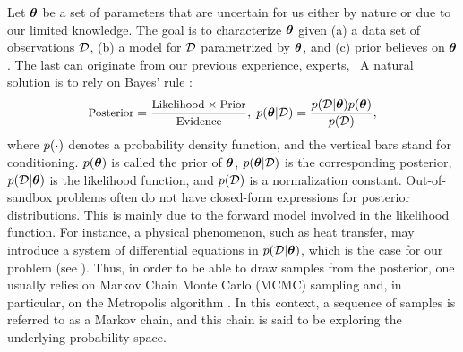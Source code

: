 Let ${\boldsymbol\theta}$ be a set of parameters that are uncertain for us either by nature or due to our limited knowledge. The goal is to characterize ${\boldsymbol\theta}$ given (a) a data set of observations $\mathcal{D}$, (b) a model for $\mathcal{D}$ parametrized by ${\boldsymbol\theta}$, and (c) prior believes on ${\boldsymbol\theta}$. The last can originate from our previous experience, experts, \etc\ A natural solution is to rely on Bayes' rule \cite{gelman2004}:
\begin{equation} \elabel{bayes}
  \text{\small Posterior} = \frac{\text{\small Likelihood} \times \text{\small Prior}}{\text{\small Evidence}}, \; \f{\vparam | \Data} = \frac{\f{\Data | \vparam} \f{\vparam}}{\f{\Data}},
\end{equation}
where $\f{\cdot}$ denotes a probability density function, and the vertical bars stand for conditioning. $\f{\vparam}$ is called the prior of ${\boldsymbol\theta}$, $\f{\vparam | \Data}$ is the corresponding posterior, $\f{\Data | \vparam}$ is the likelihood function, and $\f{\Data}$ is a normalization constant.
Out-of-sandbox problems often do not have closed-form expressions for posterior distributions. This is mainly due to the forward model involved in the likelihood function. For instance, a physical phenomenon, such as heat transfer, may introduce a system of differential equations in $\f{\Data | \vparam}$, which is the case for our problem (see ).
Thus, in order to be able to draw samples from the posterior, one usually relies on Markov Chain Monte Carlo (MCMC) sampling and, in particular, on the Metropolis algorithm \cite{gelman2004}. In this context, a sequence of samples is referred to as a Markov chain, and this chain is said to be exploring the underlying probability space.
